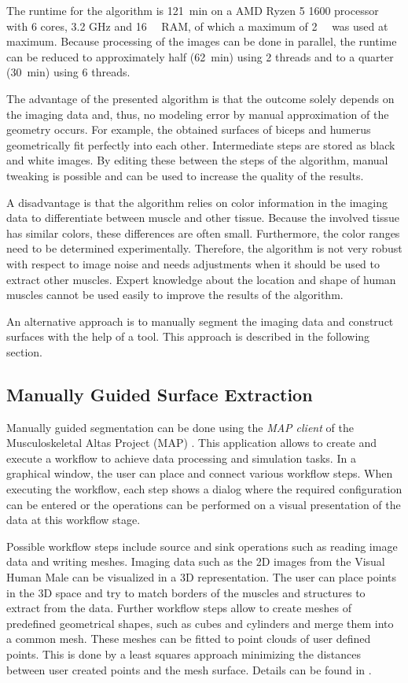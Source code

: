 The runtime for the algorithm is \SI{121}{\minute} on a AMD Ryzen 5 1600 processor with 6 cores, 3.2 GHz and \SI{16}{\giga\byte} RAM, of which a maximum of \SI{2}{\giga\byte} was used at maximum. Because processing of the images can be done in parallel, the runtime can be reduced to approximately half (\SI{62}{\minute}) using 2 threads and to a quarter (\SI{30}{\minute}) using 6 threads.

The advantage of the presented algorithm is that the outcome solely depends on the imaging data and, thus, no modeling error by manual approximation of the geometry occurs. For example, the obtained surfaces of biceps and humerus geometrically fit perfectly into each other. Intermediate steps are stored as black and white images. By editing these between the steps of the algorithm, manual tweaking is possible and can be used to increase the quality of the results.

A disadvantage is that the algorithm relies on color information in the imaging data to differentiate between muscle and other tissue. Because the involved tissue has similar colors, these differences are often small. Furthermore, the color ranges need to be determined experimentally. Therefore, the algorithm is not very robust with respect to image noise and needs adjustments when it should be used to extract other muscles. Expert knowledge about the location and shape of human muscles cannot be used easily to improve the results of the algorithm.

An alternative approach is to manually segment the imaging data and construct surfaces with the help of a tool. This approach is described in the following section.

\subsection{Manually Guided Surface Extraction}\label{sec:surf_extr}

Manually guided segmentation can be done using the \emph{MAP client} of the Musculoskeletal Altas Project (MAP) \cite{mapclient}. This application allows to create and execute a workflow to achieve data processing and simulation tasks. In a graphical window, the user can place and connect various workflow steps. When executing the workflow, each step shows a dialog where the required configuration can be entered or the operations can be performed on a visual presentation of the data at this workflow stage. 

Possible workflow steps include source and sink operations such as reading image data and writing meshes. Imaging data such as the 2D images from the Visual Human Male can be visualized in a 3D representation. The user can place points in the 3D space and try to match borders of the muscles and structures to extract from the data.
Further workflow steps allow to create meshes of predefined geometrical shapes, such as cubes and cylinders and merge them into a common mesh. These meshes can be fitted to point clouds of user defined points. This is done by a least squares approach minimizing the distances between user created points and the mesh surface. Details can be found in \cite{Fernandez2018}.

